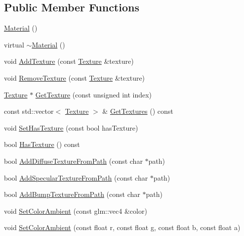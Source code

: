 \subsection*{Public Member Functions}
\begin{DoxyCompactItemize}
\item 
\mbox{\hyperlink{classngl_1_1_material_a3a1d6baa46095dec622f60884bd8bcf3}{Material}} ()
\item 
virtual \mbox{\hyperlink{classngl_1_1_material_aedc30baa2578a4e3c2bc9bdd04fdc3cd}{$\sim$\+Material}} ()
\item 
void \mbox{\hyperlink{classngl_1_1_material_aecd00cc584fe10e3204a9188b7c7d0bc}{Add\+Texture}} (const \mbox{\hyperlink{classngl_1_1_texture}{Texture}} \&texture)
\item 
void \mbox{\hyperlink{classngl_1_1_material_a25af0f7899542fa17650f8c09b7f779b}{Remove\+Texture}} (const \mbox{\hyperlink{classngl_1_1_texture}{Texture}} \&texture)
\item 
\mbox{\hyperlink{classngl_1_1_texture}{Texture}} $\ast$ \mbox{\hyperlink{classngl_1_1_material_aa689d2ee9df223df1a8382aa88df4830}{Get\+Texture}} (const unsigned int index)
\item 
const std\+::vector$<$ \mbox{\hyperlink{classngl_1_1_texture}{Texture}} $>$ \& \mbox{\hyperlink{classngl_1_1_material_af4168533e1895702d02c923e333fa5fc}{Get\+Textures}} () const
\item 
void \mbox{\hyperlink{classngl_1_1_material_a2d82dd4a9fd64d43c49fb1f28eff369c}{Set\+Has\+Texture}} (const bool has\+Texture)
\item 
bool \mbox{\hyperlink{classngl_1_1_material_abb9647254e15312d5640b705cbd36720}{Has\+Texture}} () const
\item 
bool \mbox{\hyperlink{classngl_1_1_material_a2bc319dc62d9d48b974edfb456271a85}{Add\+Diffuse\+Texture\+From\+Path}} (const char $\ast$path)
\item 
bool \mbox{\hyperlink{classngl_1_1_material_a59601e6f88d72d364ea4b6a4c51bb85a}{Add\+Specular\+Texture\+From\+Path}} (const char $\ast$path)
\item 
bool \mbox{\hyperlink{classngl_1_1_material_aa965616a454c9f7e403adf5fda91111c}{Add\+Bump\+Texture\+From\+Path}} (const char $\ast$path)
\item 
void \mbox{\hyperlink{classngl_1_1_material_a70b0d53070310c583f02bb9a51cbb60e}{Set\+Color\+Ambient}} (const glm\+::vec4 \&color)
\item 
void \mbox{\hyperlink{classngl_1_1_material_a5957c666d8203687ac9d07b9f58f13de}{Set\+Color\+Ambient}} (const float r, const float g, const float b, const float a)

\end{DoxyCompactItemize}
